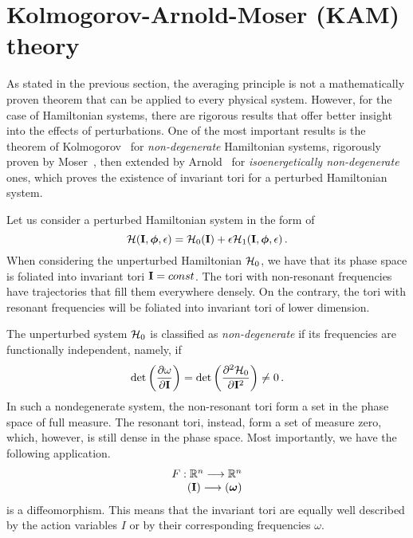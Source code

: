 \section{Kolmogorov-Arnold-Moser (KAM) theory}\label{sec:1:kam}

As stated in the previous section, the averaging principle is not a mathematically proven theorem that can be applied to every physical system. However, for the case of Hamiltonian systems, there are rigorous results that offer better insight into the effects of perturbations. One of the most important results is the theorem of Kolmogorov~\cite{KAM1} for \textit{non-degenerate} Hamiltonian systems, rigorously proven by Moser~\cite{KAM2}, then extended by Arnold~\cite{KAM3} for \textit{isoenergetically non-degenerate} ones, which proves the existence of invariant tori for a perturbed Hamiltonian system.

Let us consider a perturbed Hamiltonian system in the form of
\begin{equation}
    \mathcal{H}(\vb{I}, \boldsymbol{\phi}, \epsilon) = \mathcal{H}_0(\vb{I}) + \epsilon\mathcal{H}_1(\vb{I},\boldsymbol{\phi},\epsilon)\,.
    \label{eq:1:hamperturbed}
\end{equation}
When considering the unperturbed Hamiltonian $\mathcal{H}_0$, we have that its phase space is foliated into invariant tori $\vb{I}=const$. The tori with non-resonant frequencies have trajectories that fill them everywhere densely. On the contrary, the tori with resonant frequencies will be foliated into invariant tori of lower dimension.

The unperturbed system $\mathcal{H}_0$ is classified as \textit{non-degenerate} if its frequencies are functionally independent, namely, if
\begin{equation}
    \det\left(\pdv{\omega}{\vb{I}}\right) = \det\left(\pdv[2]{\mathcal{H}_0}{\vb{I}}\right) \neq 0 \,.
\end{equation}
In such a nondegenerate system, the non-resonant tori form a set in the phase space of full measure. The resonant tori, instead, form a set of measure zero, which, however, is still dense in the phase space. Most importantly, we have the following application.
\begin{equation}
    \begin{array}{r}
    F: \mathbb{R}^{n} \longrightarrow \mathbb{R}^n \\
    (\vb{I}) \longrightarrow(\boldsymbol{\omega})
    \end{array}
\end{equation}
is a diffeomorphism. This means that the invariant tori are equally well described by the action variables $I$ or by their corresponding frequencies $\omega$.

